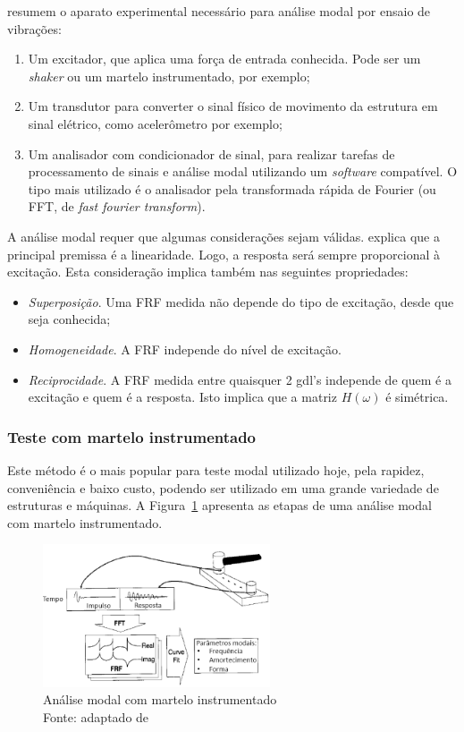 \citet{rao2011mechanical} resumem o aparato experimental necessário para análise
modal por ensaio de vibrações:
%
\begin{enumerate}
  \item Um excitador, que aplica uma força de entrada conhecida. Pode ser um
  \textit{shaker} ou um martelo instrumentado, por exemplo;
  \item Um transdutor para converter o sinal físico de movimento da estrutura em
  sinal elétrico, como acelerômetro por exemplo;
  \item Um analisador com condicionador de sinal, para realizar tarefas de
  processamento de sinais e análise modal utilizando um \textit{software} compatível. O tipo mais
  utilizado é o analisador pela transformada rápida de Fourier (ou FFT, de
  \textit{fast fourier transform}). 
\end{enumerate}

A análise modal requer que algumas considerações sejam válidas.
\citet{dossing1988structural} explica que a principal premissa é a linearidade.
Logo, a resposta será sempre proporcional à excitação. Esta consideração implica
também nas seguintes propriedades:
%
\begin{itemize}	
  \item \emph{Superposição}. Uma FRF medida não depende do tipo de excitação, desde que
  seja conhecida;
  \item \emph{Homogeneidade}. A FRF independe do nível de excitação.
  \item \emph{Reciprocidade}. A FRF medida entre quaisquer 2 gdl's independe
  de quem é a excitação e quem é a resposta. Isto implica que a matriz
  $H(\omega)$ é simétrica.
\end{itemize}

\subsubsection{Teste com martelo instrumentado}

Este método é o mais popular para teste modal utilizado hoje, pela rapidez,
conveniência e baixo custo, podendo ser utilizado em uma grande variedade de
estruturas e máquinas. A Figura~\ref{fig::impact_testing} apresenta as etapas de
uma análise modal com martelo instrumentado.

\begin{figure}[h]
	\centering 
 	\includegraphics[width=0.60\textwidth]{figs/impact_testing}
 	\caption[Análise modal com martelo instrumentado]{Análise modal com martelo
 	instrumentado \\
 	Fonte: adaptado de \cite{schwarz1999experimental}}
 	\label{fig::impact_testing}
\end{figure}

